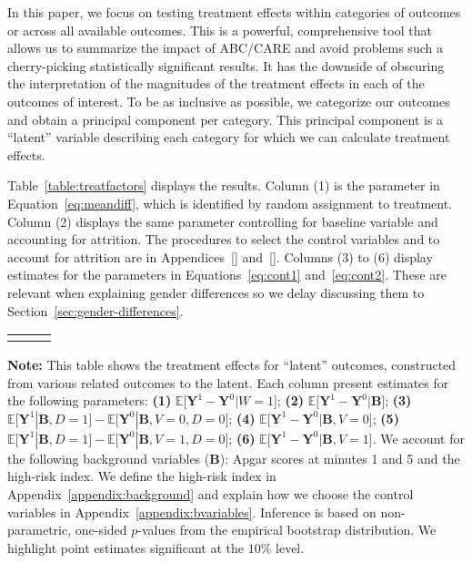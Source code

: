 

In this paper, we focus on testing treatment effects within categories of outcomes or across all available outcomes. This is a powerful, comprehensive tool that allows us to summarize the impact of ABC/CARE and avoid problems such a cherry-picking statistically significant results. It has the downside of obscuring the interpretation of the magnitudes of the treatment effects in each of the outcomes of interest. To be as inclusive as possible, we categorize our outcomes and obtain a principal component per category. This principal component is a ``latent'' variable describing each category for which we can calculate treatment effects.

Table~\ref{table:treatfactors} displays the results. Column (1) is the parameter in Equation~\eqref{eq:meandiff}, which is identified by random assignment to treatment. Column (2) displays the same parameter controlling for baseline variable and accounting for attrition. The procedures to select the control variables and to account for attrition are in Appendices~\ref{} and~\ref{}. Columns (3) to (6) display estimates for the parameters in Equations~\eqref{eq:cont1} and~\eqref{eq:cont2}. These are relevant when explaining gender differences so we delay discussing them to Section~\ref{sec:gender-differences}.

\begin{sidewaystable}[!htpb]
\begin{threeparttable}
\caption{Treatment Effects on Latent Outcomes \textbf{[JLG: This table is wrong.]}} \label{table:treatfactors}
\centering 
\begin{tabularx}{22.5cm}{XcX}
&  & 
\end{tabularx}
\begin{tablenotes}
\footnotesize
\item \textbf{Note:} This table shows the treatment effects for ``latent'' outcomes, constructed from various related outcomes to the latent. Each column present estimates for the following parameters: \textbf{(1)} $\mathbb{E} \big[ \bm{Y}^1 - \bm{Y}^0 | W = 1]$; {\textbf{(2)} $\mathbb{E} \big[ \bm{Y}^1 - \bm{Y}^0 | \bm{B} \big]$}; {\textbf{(3)} $\mathbb{E} \big[ \bm{Y}^1 | \bm{B}, D=1 \big] - \mathbb{E} \big[ \bm{Y}^0 | \bm{B}, V=0, D=0 \big]$}; {\textbf{(4)} $\mathbb{E} \big[ \bm{Y}^1 - \bm{Y}^0 | \bm{B}, V=0 \big] $}; {\textbf{(5)} $\mathbb{E} \big[ \bm{Y}^1 | \bm{B}, D=1 \big] - \mathbb{E} \big[ \bm{Y}^0 | \bm{B}, V=1, D = 0 \big]$}; {\textbf{(6)} $\mathbb{E} \big[ \bm{Y}^1 - \bm{Y}^0 | \bm{B}, V=1 \big]$}. We account for the following background variables ($\bm{B}$): Apgar scores at minutes 1 and 5 and the high-risk index. We define the high-risk index in Appendix~\ref{appendix:background} and explain how we choose the control variables in Appendix~\ref{appendix:bvariables}. Inference is based on non-parametric, one-sided $p$-values from the empirical bootstrap distribution. We highlight point estimates significant at the $10\%$ level.
\end{tablenotes}
\end{threeparttable}
\end{sidewaystable}

